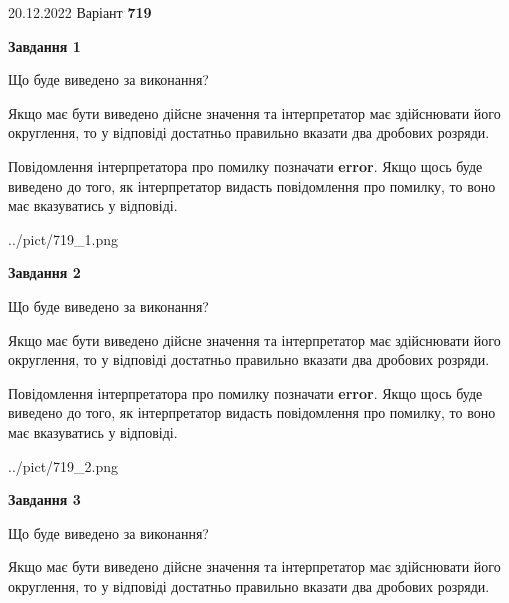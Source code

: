 \documentclass[12pt, ukrainian]{article}
\begin{document}
{20.12.2022 Варіант \No \textbf { 719 }\par}
{
\begin {Large}

{\begin {center}\textbf{Завдання 1}\end {center}}\par
Що буде виведено за виконання? \par

Якщо має бути виведено дійсне значення та інтерпретатор має здійснювати його округлення, 
то у відповіді достатньо правильно вказати два дробових розряди.

Повідомлення інтерпретатора про помилку позначати \textbf{error}.
Якщо щось буде виведено до того, як інтерпретатор видасть повідомлення про помилку, 
то воно має вказуватись у відповіді. \par

\begin{center}
	{../pict/719_1.png}
\end{center}
\newpage

{\begin {center}\textbf{Завдання 2}\end {center}}\par
Що буде виведено за виконання? \par

Якщо має бути виведено дійсне значення та інтерпретатор має здійснювати його округлення, 
то у відповіді достатньо правильно вказати два дробових розряди.

Повідомлення інтерпретатора про помилку позначати \textbf{error}.
Якщо щось буде виведено до того, як інтерпретатор видасть повідомлення про помилку, 
то воно має вказуватись у відповіді. \par

\begin{center}
	{../pict/719_2.png}
\end{center}
\newpage

{\begin {center}\textbf{Завдання 3}\end {center}}\par
Що буде виведено за виконання? \par

Якщо має бути виведено дійсне значення та інтерпретатор має здійснювати його округлення, 
то у відповіді достатньо правильно вказати два дробових розряди.


\end{Large}}
\end{document}
